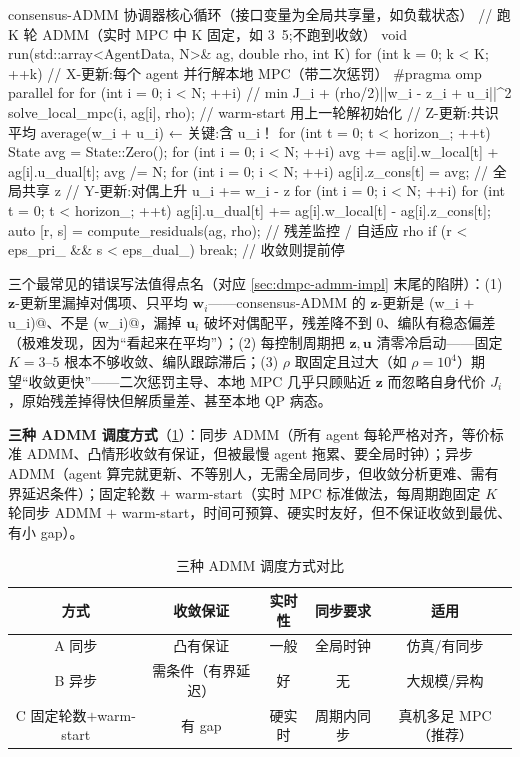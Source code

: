 \begin{codebox}[C++]{consensus-ADMM 协调器核心循环（接口变量为全局共享量，如负载状态）}
// 跑 K 轮 ADMM（实时 MPC 中 K 固定，如 3~5;不跑到收敛）
void run(std::array<AgentData, N>& ag, double rho, int K) {
  for (int k = 0; k < K; ++k) {
    // X-更新:每个 agent 并行解本地 MPC（带二次惩罚）
    #pragma omp parallel for
    for (int i = 0; i < N; ++i)         // min J_i + (rho/2)||w_i - z_i + u_i||^2
      solve_local_mpc(i, ag[i], rho);   // warm-start 用上一轮解初始化
    // Z-更新:共识平均 average(w_i + u_i)  ← 关键:含 u_i！
    for (int t = 0; t < horizon_; ++t) {
      State avg = State::Zero();
      for (int i = 0; i < N; ++i) avg += ag[i].w_local[t] + ag[i].u_dual[t];
      avg /= N;
      for (int i = 0; i < N; ++i) ag[i].z_cons[t] = avg;   // 全局共享 z
    }
    // Y-更新:对偶上升 u_i += w_i - z
    for (int i = 0; i < N; ++i)
      for (int t = 0; t < horizon_; ++t)
        ag[i].u_dual[t] += ag[i].w_local[t] - ag[i].z_cons[t];
    auto [r, s] = compute_residuals(ag, rho);   // 残差监控 / 自适应 rho
    if (r < eps_pri_ && s < eps_dual_) break;    // 收敛则提前停
  }
}
\end{codebox}

\noindent 三个最常见的错误写法值得点名（对应 \cref{sec:dmpc-admm-impl} 末尾的陷阱）：(1) $\mathbf{z}$-更新里漏掉对偶项、只平均 $\mathbf{w}_i$——consensus-ADMM 的 $\mathbf{z}$-更新是 \verb@average(w_i + u_i)@、不是 \verb@average(w_i)@，漏掉 $\mathbf{u}_i$ 破坏对偶配平，残差降不到 $0$、编队有稳态偏差（极难发现，因为“看起来在平均”）；(2) 每控制周期把 $\mathbf{z},\mathbf{u}$ 清零冷启动——固定 $K=3$–$5$ 根本不够收敛、编队跟踪滞后；(3) $\rho$ 取固定且过大（如 $\rho=10^4$）期望“收敛更快”——二次惩罚主导、本地 MPC 几乎只顾贴近 $\mathbf{z}$ 而忽略自身代价 $J_i$，原始残差掉得快但解质量差、甚至本地 QP 病态。

\textbf{三种 ADMM 调度方式}（\cref{tab:dmpc-schedule}）：同步 ADMM（所有 agent 每轮严格对齐，等价标准 ADMM、凸情形收敛有保证，但被最慢 agent 拖累、要全局时钟）；异步 ADMM（agent 算完就更新、不等别人，无需全局同步，但收敛分析更难、需有界延迟条件）；固定轮数 $+$ warm-start（实时 MPC 标准做法，每周期跑固定 $K$ 轮同步 ADMM $+$ warm-start，时间可预算、硬实时友好，但不保证收敛到最优、有小 gap）。

\begin{table}[H]\centering\small
\caption{三种 ADMM 调度方式对比}
\label{tab:dmpc-schedule}
\begin{tabular}{ccccc}
\toprule
方式 & 收敛保证 & 实时性 & 同步要求 & 适用 \\
\midrule
A 同步 & 凸有保证 & 一般 & 全局时钟 & 仿真/有同步 \\
B 异步 & 需条件（有界延迟） & 好 & 无 & 大规模/异构 \\
C 固定轮数$+$warm-start & 有 gap & 硬实时 & 周期内同步 & 真机多足 MPC（推荐） \\
\bottomrule
\end{tabular}
\end{table}

